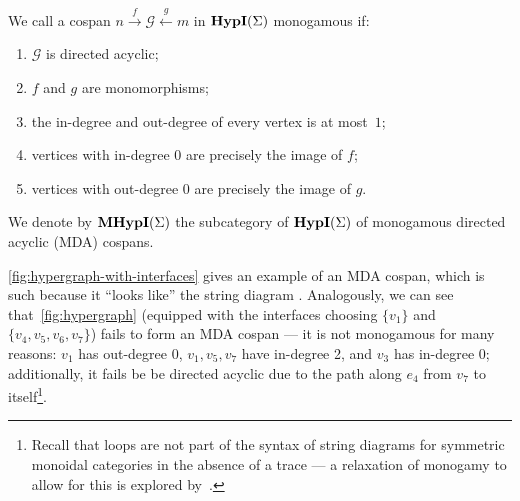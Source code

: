 \begin{defi}%
	\label{def:monogamy_hyp}
	We call a cospan $n \xrightarrow{f} \mathcal{G} \xleftarrow{g} m$ in $\textbf{HypI}(\Sigma)$ monogamous if:
	\begin{enumerate}
		\item $\mathcal{G}$ is directed acyclic;
		\item $f$ and $g$ are monomorphisms;
		\item the in-degree and out-degree of every vertex is at most~$1$;
		\item vertices with in-degree $0$ are precisely the image of $f$;
		\item vertices with out-degree $0$ are precisely the image of $g$.
	\end{enumerate}
	We denote by $\textbf{MHypI}(\Sigma)$ the subcategory of $\textbf{HypI}(\Sigma)$ of monogamous directed acyclic (MDA) cospans.
\end{defi}

\autoref{fig:hypergraph-with-interfaces} gives an example of an MDA cospan, which is such because it \enquote{looks like} the string diagram \comonoid.
Analogously, we can see that~\autoref{fig:hypergraph} (equipped with the interfaces choosing $\{ v_1 \}$ and $\{ v_4, v_5, v_6, v_7 \}$) fails to form an MDA cospan --- it is not monogamous for many reasons: $v_1$ has out-degree 0, $v_1, v_5, v_7$ have in-degree 2, and $v_3$ has in-degree 0; additionally, it fails be be directed acyclic due to the path along $e_4$ from $v_7$ to itself\footnote{Recall that loops are not part of the syntax of string diagrams for symmetric monoidal categories in the absence of a trace --- a relaxation of monogamy to allow for this is explored by~\citet{ghica_rewriting_2023}.}.


